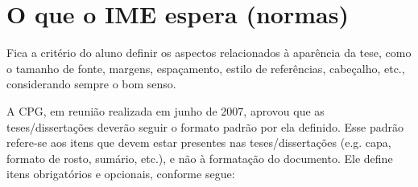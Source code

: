 
\chapter{O que o IME espera (normas)}

Fica a critério do aluno definir os aspectos relacionados à aparência da
tese, como o tamanho de fonte, margens, espaçamento, estilo de referências,
cabeçalho, etc., considerando sempre o bom senso.

A CPG, em reunião realizada em junho de 2007, aprovou que as
teses/dissertações deverão seguir o formato padrão por ela definido.
Esse padrão refere-se aos itens que devem estar presentes nas teses/dissertações
(e.g. capa, formato de rosto, sumário, etc.), e não à formatação do documento.
Ele define itens obrigatórios e opcionais, conforme segue:

